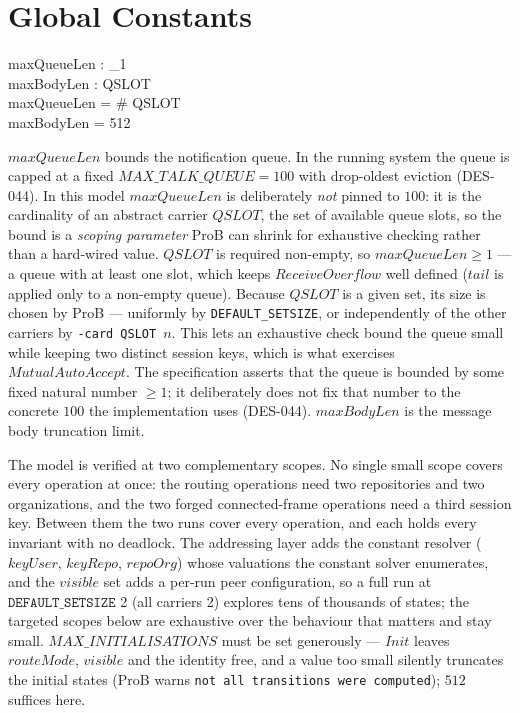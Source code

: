 \documentclass[a4paper,10pt,fleqn]{article}
\begin{document}
\section{Global Constants}

\begin{zed}
  [QSLOT]
\end{zed}

\begin{axdef}
  maxQueueLen : \nat_1 \\
  maxBodyLen : \nat
\where
  QSLOT \neq \emptyset \\
  maxQueueLen = \# QSLOT \\
  maxBodyLen = 512
\end{axdef}

$maxQueueLen$ bounds the notification queue.  In the running system the
queue is capped at a fixed $MAX\_TALK\_QUEUE = 100$ with drop-oldest
eviction (DES-044).  In this model $maxQueueLen$ is deliberately
\emph{not} pinned to $100$: it is the cardinality of an abstract carrier
$QSLOT$, the set of available queue slots, so the bound is a
\emph{scoping parameter} ProB can shrink for exhaustive checking rather
than a hard-wired value.  $QSLOT$ is required non-empty, so
$maxQueueLen \geq 1$ --- a queue with at least one slot, which keeps
$ReceiveOverflow$ well defined ($tail$ is applied only to a non-empty
queue).  Because $QSLOT$ is a given set, its size is chosen by ProB ---
uniformly by \texttt{DEFAULT\_SETSIZE}, or independently of the other
carriers by \texttt{-card QSLOT}~$n$.  This lets an exhaustive check
bound the queue small while keeping two distinct session keys, which is
what exercises $MutualAutoAccept$.  The specification asserts that the
queue is bounded by some fixed natural number $\geq 1$; it deliberately
does not fix that number to the concrete $100$ the implementation uses
(DES-044).  $maxBodyLen$ is the message body truncation limit.

The model is verified at two complementary scopes.  No single small
scope covers every operation at once: the routing operations need two
repositories and two organizations, and the two forged connected-frame
operations need a third session key.  Between them the two runs cover
every operation, and each holds every invariant with no deadlock.  The
addressing layer adds the constant resolver ($keyUser$, $keyRepo$,
$repoOrg$) whose valuations the constant solver enumerates, and the
$visible$ set adds a per-run peer configuration, so a full run at
$\texttt{DEFAULT\_SETSIZE}$ 2 (all carriers 2) explores tens of
thousands of states; the targeted scopes below are exhaustive over the
behaviour that matters and stay small.  $MAX\_INITIALISATIONS$ must be
set generously --- $Init$ leaves $routeMode$, $visible$ and the identity
free, and a value too small silently truncates the initial states (ProB
warns \texttt{not all transitions were computed}); $512$ suffices here.
\end{document}
